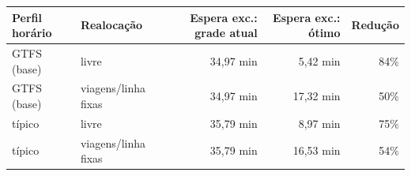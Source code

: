 \begin{tabular}{llrrr}
\toprule
Perfil horário & Realocação & Espera exc.: grade atual & Espera exc.: ótimo & Redução \\
\midrule
GTFS (base) & livre & 34{,}97 min & 5{,}42 min & 84\% \\
GTFS (base) & viagens/linha fixas & 34{,}97 min & 17{,}32 min & 50\% \\
típico & livre & 35{,}79 min & 8{,}97 min & 75\% \\
típico & viagens/linha fixas & 35{,}79 min & 16{,}53 min & 54\% \\
\bottomrule
\end{tabular}
